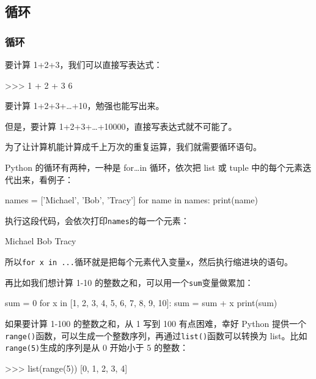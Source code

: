 \hypertarget{ux5faaux73af}{%
\subsection{循环}\label{ux5faaux73af}}

\hypertarget{ux5faaux73af-1}{%
\subsubsection{循环}\label{ux5faaux73af-1}}

要计算 1+2+3，我们可以直接写表达式：

\begin{pythoncode}
>>> 1 + 2 + 3
6
\end{pythoncode}

要计算 1+2+3+\ldots+10，勉强也能写出来。

但是，要计算 1+2+3+\ldots+10000，直接写表达式就不可能了。

为了让计算机能计算成千上万次的重复运算，我们就需要循环语句。

Python 的循环有两种，一种是 for\ldots in 循环，依次把 list 或 tuple
中的每个元素迭代出来，看例子：

\begin{pythoncode}
names = ['Michael', 'Bob', 'Tracy']
for name in names:
    print(name)
\end{pythoncode}

执行这段代码，会依次打印\texttt{names}的每一个元素：

\begin{pythoncode}
Michael
Bob
Tracy
\end{pythoncode}

所以\texttt{for\ x\ in\ ...}循环就是把每个元素代入变量\texttt{x}，然后执行缩进块的语句。

再比如我们想计算 1-10 的整数之和，可以用一个\texttt{sum}变量做累加：

\begin{pythoncode}
sum = 0
for x in [1, 2, 3, 4, 5, 6, 7, 8, 9, 10]:
    sum = sum + x
print(sum)
\end{pythoncode}

如果要计算 1-100 的整数之和，从 1 写到 100 有点困难，幸好 Python
提供一个\texttt{range()}函数，可以生成一个整数序列，再通过\texttt{list()}函数可以转换为
list。比如\texttt{range(5)}生成的序列是从 0 开始小于 5 的整数：

\begin{pythoncode}
>>> list(range(5))
[0, 1, 2, 3, 4]
\end{pythoncode}

